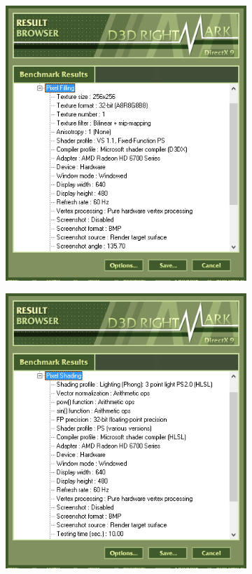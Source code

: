 \documentclass[
	a4paper,
	oneside,
	BCOR = 10mm,
	DIV = 12,
	12pt,
	headings = normal,
]{scrartcl}
\begin{document}
\begin{figure}[!htbp]
\begin{subfigure}[t]{\columnwidth / 2}
					\caption{}
					\label{subfig:d3drightmark-hiddenpix-res}
				\end{subfigure}
				\begin{subfigure}[t]{\columnwidth / 2}
					\centering
					\includegraphics[height=10\baselineskip]{./assets/y03s02-pcdiag-lab-04-p04-02-d3drightmark-pxfill-res.png}
					\caption{}
					\label{subfig:d3drightmark-pxfill-res}
				\end{subfigure}%
				\begin{subfigure}[t]{\columnwidth / 2}
					\centering
					\includegraphics[height=10\baselineskip]{./assets/y03s02-pcdiag-lab-04-p04-03-d3drightmark-pxshading-01-res.png}

\end{subfigure}
\end{figure}
\end{document}
